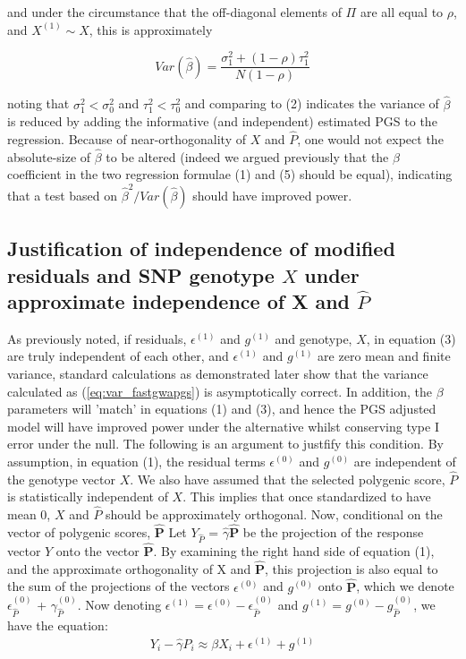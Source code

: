 \documentclass[10pt]{article}
\begin{document}
and under the circumstance that the off-diagonal elements of  $\Pi$ are all equal to $\rho$, and $X^{(1)} \sim X$, this is approximately

 \begin{equation}
Var(\hat{ \beta})= \frac{\sigma_1^2+(1-\rho)\tau_1^2}{N(1-\rho)}
\end{equation}

noting that $\sigma_1^2 < \sigma_0^2$ and $\tau_1^2 < \tau_0^2 $ and comparing to (2) indicates the variance of $\hat{\beta}$ is reduced by adding the informative (and independent) estimated PGS to the regression.  Because of near-orthogonality of $X$ and $\hat{P}$, one would not expect the absolute-size of $\hat{\beta}$ to be altered (indeed we argued previously that the $\beta$ coefficient in the two regression formulae (1) and (5) should be equal), indicating that a test based on $\hat{\beta}^2/Var(\hat{ \beta})$ should have improved power.

\subsection*{Justification of independence of modified residuals and SNP genotype $X$ under approximate independence of X and $\hat{P}$}

As previously noted, if residuals, $\epsilon^{(1)}$ and $g^{(1)}$ and genotype, $X$, in equation (3) are truly independent of each other, and $\epsilon^{(1)}$ and $g^{(1)}$ are zero mean and finite variance, standard calculations as demonstrated later show that the variance calculated as (\ref{eq:var_fastgwapgs}) is asymptotically correct.  In addition, the $\beta$ parameters will 'match' in equations (1) and (3), and hence the PGS adjusted model will have improved power under the alternative whilst conserving type I error under the null.  The following is an argument to justfify this condition. 
 By assumption, in equation (1), the residual terms $\epsilon^{(0)}$ and $g^{(0)}$ are independent of the genotype vector $X$.  We also have assumed that the selected polygenic score, $\hat{P}$ is statistically independent of $X$.  This implies that once standardized to have mean 0, $X$ and $\hat{P}$ should be approximately orthogonal.  Now, conditional on the vector of polygenic scores, $\mathbf{\hat{P}}$ Let $Y_{\hat{P}}$ = $\hat{\gamma} \mathbf{\hat{P}}$ be the projection of the response vector $Y$ onto the vector $\mathbf{\hat{P}}$.  By examining the right hand side of equation (1), and the approximate orthogonality of X and $\mathbf{\hat{P}}$, this projection is also equal to the sum of the projections of the vectors $\epsilon^{(0)}$ and $g^{(0)}$ onto $\mathbf{\hat{P}}$, which we denote $\epsilon^{(0)}_{\hat{P}}$ + $\gamma^{(0)}_{\hat{P}}$.  Now denoting  $\epsilon^{(1)}=\epsilon^{(0)}-\epsilon^{(0)}_{\hat{P}}$ and $g^{(1)}=g^{(0)}-g^{(0)}_{\hat{P}}$, we have the equation:
 \begin{equation}
 	Y_{i} - \hat{\gamma}\hat{P}_{i} \approx \beta X_{i} + \epsilon^{(1)} + g^{(1)}
 \end{equation}
\end{document}
